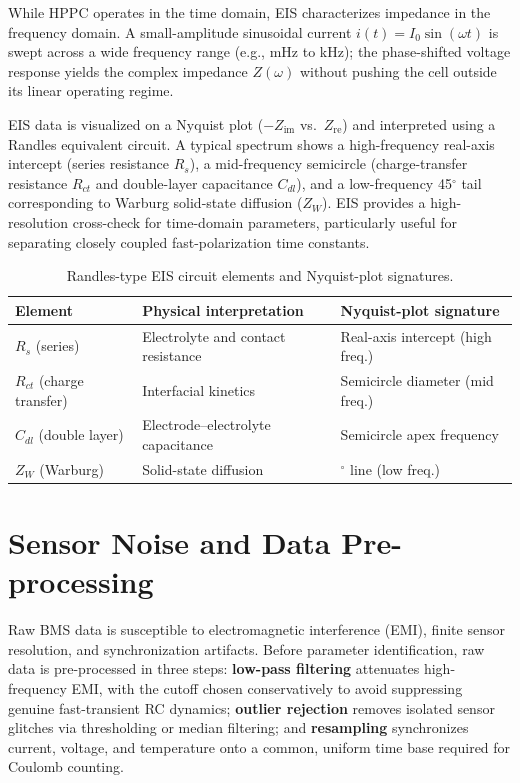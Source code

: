 While HPPC operates in the time domain, EIS characterizes impedance in the frequency domain. A small-amplitude sinusoidal current $i(t) = I_0 \sin(\omega t)$ is swept across a wide frequency range (e.g., mHz to kHz); the phase-shifted voltage response yields the complex impedance $Z(\omega)$ without pushing the cell outside its linear operating regime.

EIS data is visualized on a Nyquist plot ($-Z_{\text{im}}$ vs.\ $Z_{\text{re}}$) and interpreted using a Randles equivalent circuit. A typical spectrum shows a high-frequency real-axis intercept (series resistance $R_s$), a mid-frequency semicircle (charge-transfer resistance $R_{ct}$ and double-layer capacitance $C_{dl}$), and a low-frequency 45$^\circ$ tail corresponding to Warburg solid-state diffusion ($Z_W$). EIS provides a high-resolution cross-check for time-domain parameters, particularly useful for separating closely coupled fast-polarization time constants.

\begin{table}[htbp]
\centering
\caption{Randles-type EIS circuit elements and Nyquist-plot signatures.}
\label{tab:eis_elements}
\footnotesize
\begin{tabularx}{\textwidth}{
    >{\raggedright\arraybackslash}p{2.6cm}
    >{\raggedright\arraybackslash}X
    >{\raggedright\arraybackslash}X
}
\toprule
\textbf{Element} & \textbf{Physical interpretation} & \textbf{Nyquist-plot signature} \\
\midrule
$R_s$ (series) & Electrolyte and contact resistance & Real-axis intercept (high freq.) \\
$R_{ct}$ (charge transfer) & Interfacial kinetics & Semicircle diameter (mid freq.) \\
$C_{dl}$ (double layer) & Electrode--electrolyte capacitance & Semicircle apex frequency \\
$Z_W$ (Warburg) & Solid-state diffusion & 45$^\circ$ line (low freq.) \\
\bottomrule
\end{tabularx}
\end{table}

\section{Sensor Noise and Data Pre-processing}
\label{sec:noise_preprocessing}

Raw BMS data is susceptible to electromagnetic interference (EMI), finite sensor resolution, and synchronization artifacts. Before parameter identification, raw data is pre-processed in three steps: \textbf{low-pass filtering} attenuates high-frequency EMI, with the cutoff chosen conservatively to avoid suppressing genuine fast-transient RC dynamics; \textbf{outlier rejection} removes isolated sensor glitches via thresholding or median filtering; and \textbf{resampling} synchronizes current, voltage, and temperature onto a common, uniform time base required for Coulomb counting.

